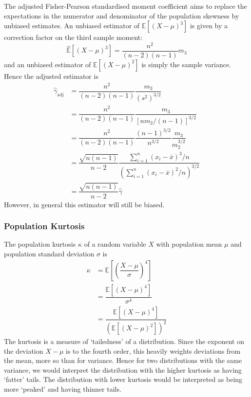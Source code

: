 \documentclass[11pt]{report} %
\begin{document}
The adjusted Fisher-Pearson standardised moment coefficient aims to replace the expectations in the numerator and denominator of the population skewness by unbiased estimates. An unbiased estimator of $\mathbb{E}\left[\left(X - \mu\right)^{3}\right]$ is given by a correction factor on the third sample moment:
\begin{equation}
\widehat{\mathbb{E}}\left[\left(X - \mu\right)^{3}\right] = \dfrac{n^{2}}{\left(n  -2\right)\left(n - 1\right)}m_{3}
\end{equation}
and an unbiased estimator of $\mathbb{E}\left[\left(X - \mu\right)^{2}\right]$ is simply the sample variance. Hence the adjusted estimator is
\begin{align}
\hat{\gamma}_{\mathrm{adj}} &= \dfrac{n^{2}}{\left(n - 2\right)\left(n - 1\right)}\dfrac{m_{3}}{\left(s^{2}\right)^{3/2}} \\
&= \dfrac{n^{2}}{\left(n - 2\right)\left(n - 1\right)}\dfrac{m_{3}}{\left[nm_{2}/\left(n - 1\right)\right]^{3/2}} \\
&= \dfrac{n^{2}}{\left(n - 2\right)\left(n - 1\right)}\dfrac{\left(n - 1\right)^{3/2}}{n^{3/2}}\dfrac{m_{3}}{m_{2}^{3/2}} \\
&= \dfrac{\sqrt{n\left(n - 1\right)}}{n - 2}\dfrac{\sum_{i = 1}^{n}\left(x_{i} - \overline{x}\right)^{3}/n}{\left(\sum_{i = 1}^{n}\left(x_{i} - \overline{x}\right)^{2}/n\right)^{3/2}} \\
&= \dfrac{\sqrt{n\left(n - 1\right)}}{n - 2}\hat{\gamma}
\end{align}
However, in general this estimator will still be biased.

\subsubsection{Population Kurtosis}

The population kurtosis $\kappa$ of a random variable $X$ with population mean $\mu$ and population standard deviation $\sigma$ is
\begin{align}
\kappa &= \mathbb{E}\left[\left(\dfrac{X - \mu}{\sigma}\right)^{4}\right] \\
&= \dfrac{\mathbb{E}\left[\left(X - \mu\right)^{4}\right]}{\sigma^{4}} \\
&= \dfrac{\mathbb{E}\left[\left(X - \mu\right)^{4}\right]}{\left(\mathbb{E}\left[\left(X - \mu\right)^{2}\right]\right)^{2}}
\end{align}
The kurtosis is a measure of `tailedness' of a distribution. Since the exponent on the deviation $X - \mu$ is to the fourth order, this heavily weights deviations from the mean, more so than for variance. Hence for two distributions with the same variance, we would interpret the distribution with the higher kurtosis as having `fatter' tails. The distribution with lower kurtosis would be interpreted as being more `peaked' and having thinner tails.
\end{document}
